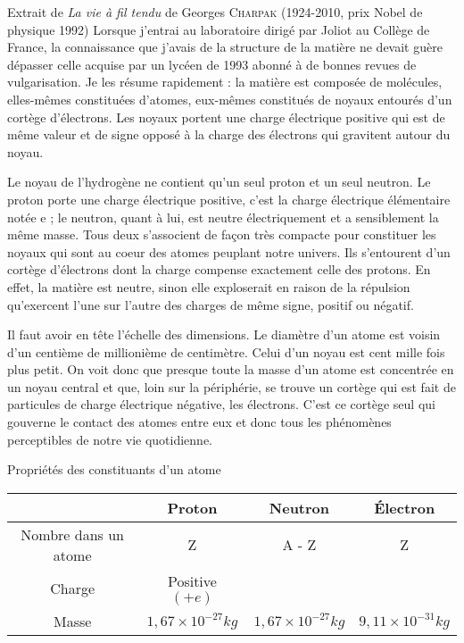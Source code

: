 \begin{doc}  {Extrait de \textit{La vie à fil tendu} de Georges \textsc{Charpak} (1924-2010, prix Nobel de physique 1992)}
  Lorsque j'entrai au laboratoire dirigé par Joliot au Collège de France, la connaissance que j'avais de la structure de la matière ne devait guère dépasser celle  acquise par un lycéen de 1993 abonné à de bonnes revues de vulgarisation.
  Je les résume rapidement : la matière est composée de molécules, elles-mêmes constituées d'atomes, eux-mêmes constitués de noyaux entourés d'un cortège d'électrons.
  Les noyaux portent une charge électrique positive qui est de même valeur et de signe opposé à la charge des électrons qui gravitent autour du noyau.
  \bigskip   

  Le noyau de l'hydrogène ne contient qu’un seul proton et un seul neutron.
  Le proton porte une charge électrique positive, c'est la charge électrique élémentaire notée \og e \fg ; le neutron, quant à lui, est neutre électriquement et a sensiblement la même masse.
  Tous deux s'associent de façon très compacte pour constituer les noyaux qui sont au coeur des atomes peuplant notre univers.
  Ils s'entourent d'un cortège d'électrons dont la charge compense exactement celle des protons.
  En effet, la matière est neutre, sinon elle exploserait en raison de la répulsion qu'exercent l'une sur l'autre des charges de même signe, positif ou négatif.
  \bigskip   
             
  Il faut avoir en tête l'échelle des dimensions.
  Le diamètre d'un atome est voisin d'un centième de millionième de centimètre.
  Celui d'un noyau est cent mille fois plus petit.
  On voit donc que presque toute la masse d'un atome est concentrée en un noyau central et que, loin sur la périphérie, se trouve un cortège qui est fait de particules de charge électrique négative, les électrons.
  C'est ce cortège seul qui gouverne le contact des atomes entre eux et donc tous les phénomènes perceptibles de notre vie quotidienne.
\end{doc}    

\begin{doc}{Propriétés des constituants d'un atome}
 \label{doc:propriete_atome}
  \vspace*{-24pt}
  \begin{encart}
    \begin{center}
      \begin{tabular}{| c | c | c | c |}
        \hline
        \rowcolor{gray!20}
        & Proton & Neutron & Électron
        \\ \hline
        Nombre dans un atome &
        Z & A - Z & Z
        \\ \hline
        Charge &
        Positive $(+ e)$ & &
        \\ \hline
        Masse &
        $1,\!67 \times 10^{-27} \unit{kg}$ &
        $1,\!67 \times 10^{-27} \unit{kg}$ &
        $9,\!11 \times 10^{-31} \unit{kg}$
        \\ \hline
      \end{tabular}
    \end{center}
  \end{encart}
\end{doc}


